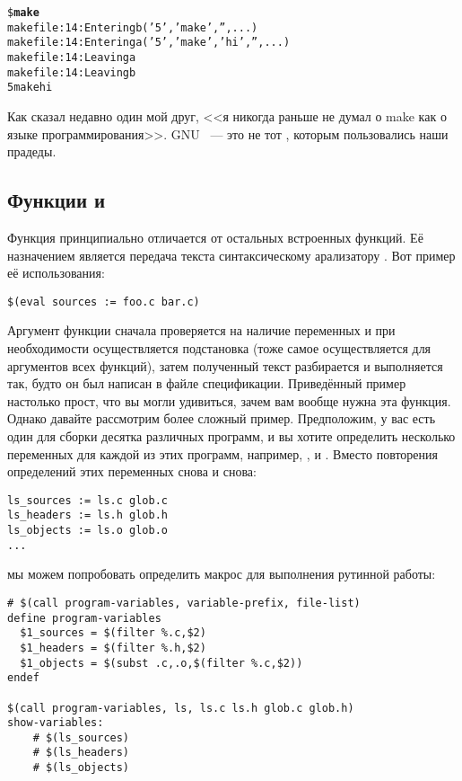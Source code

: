 {\footnotesize
\begin{alltt}
\${} \textbf{make}
makefile:14: Entering b( '5', 'make', '', ...)
makefile:14: Entering a( '5', 'make', 'hi', '', ...)
makefile:14: Leaving a
makefile:14: Leaving b
5 make hi
\end{alltt}
}
Как сказал недавно один мой друг, <<я никогда раньше не думал о make
как о языке программирования>>. GNU \GNUmake{}~--- это не тот
\GNUmake{}, которым пользовались наши прадеды.

\subsection{Функции  и }

Функция  принципиально отличается от остальных
встроенных функций. Её назначением является передача текста
синтаксическому арализатору \GNUmake{}. Вот пример её использования:

{\footnotesize
\begin{verbatim}
$(eval sources := foo.c bar.c)
\end{verbatim}
}

Аргумент функции  сначала проверяется на наличие
переменных и при необходимости осуществляется подстановка (тоже самое
осуществляется для аргументов всех функций), затем полученный текст
разбирается и выполняется так, будто он был написан в файле
спецификации.  Приведённый пример настолько прост, что вы могли
удивиться, зачем вам вообще нужна эта функция. Однако давайте
рассмотрим более сложный пример. Предположим, у вас есть один
\Makefile{} для сборки десятка различных программ, и вы хотите
определить несколько переменных для каждой из этих программ, например,
,  и . Вместо
повторения определений этих переменных снова и снова:

{\footnotesize
\begin{verbatim}
ls_sources := ls.c glob.c
ls_headers := ls.h glob.h
ls_objects := ls.o glob.o
...
\end{verbatim}
}

{\flushleft мы можем попробовать определить макрос для выполнения
рутинной работы:}

{\footnotesize
\begin{verbatim}
# $(call program-variables, variable-prefix, file-list)
define program-variables
  $1_sources = $(filter %.c,$2)
  $1_headers = $(filter %.h,$2)
  $1_objects = $(subst .c,.o,$(filter %.c,$2))
endef

$(call program-variables, ls, ls.c ls.h glob.c glob.h)
show-variables:
    # $(ls_sources)
    # $(ls_headers)
    # $(ls_objects)
\end{verbatim}
}

